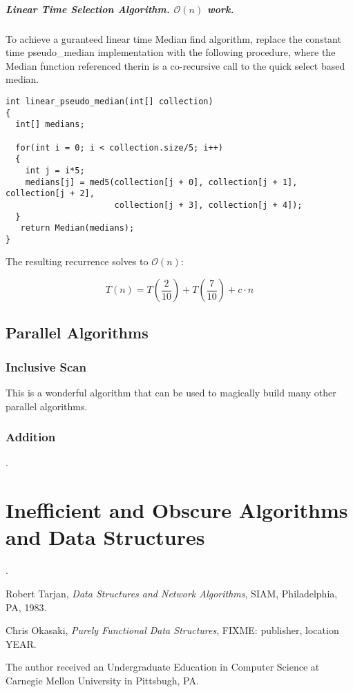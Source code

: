\documentclass[12pt, letterpaper]{book}
\newcommand{\bigO}{\mathcal{O}}
\begin{document}
\subsubsection{Linear Time Selection Algorithm. $\bigO(n)$ work. }

To achieve a guranteed linear time Median find algorithm, replace the constant time pseudo\_median implementation with the following procedure, where the Median function referenced therin is a co-recursive call to the quick select based median.

\begin{verbatim}
int linear_pseudo_median(int[] collection)
{
  int[] medians;

  for(int i = 0; i < collection.size/5; i++)
  {
    int j = i*5;
    medians[j] = med5(collection[j + 0], collection[j + 1], collection[j + 2],
                      collection[j + 3], collection[j + 4]);
  }
   return Median(medians);
}
\end{verbatim}

The resulting recurrence solves to $\bigO(n)$:

$$T(n) = T\left(\frac{2}{10}\right) + T\left(\frac{7}{10}\right) + c\cdot n$$


	\chapter{Parallel Algorithms}  \label{parallel algorithms}

		\section{Inclusive Scan}

		This is a wonderful algorithm that can be used to magically build many other parallel algorithms.

		\section{Addition}.

\part{Inefficient and Obscure Algorithms and Data Structures}

.


\begin{thebibliography}{9}

  Robert Tarjan,
  \emph{Data Structures and Network Algorithms},
  SIAM, Philadelphia, PA,
  1983.

  Chris Okasaki,
  \emph{Purely Functional Data Structures},
  FIXME: publisher, location
  YEAR.

	The author received an Undergraduate Education in Computer Science at Carnegie Mellon University in Pittsbugh, PA.

\end{thebibliography}



\end{document}
